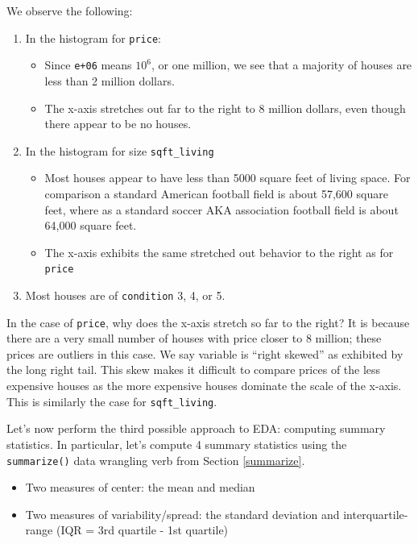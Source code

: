 \documentclass[12pt, krantz2,]{krantz}
\providecommand{\tightlist}{%
  \setlength{\itemsep}{0pt}\setlength{\parskip}{0pt}}
\begin{document}
We observe the following:

\begin{enumerate}
\def\labelenumi{\arabic{enumi}.}
\tightlist
\item
  In the histogram for \texttt{price}:

  \begin{itemize}
  \tightlist
  \item
    Since \texttt{e+06} means \(10^6\), or one million, we see that a majority of houses are less than 2 million dollars.
  \item
    The x-axis stretches out far to the right to 8 million dollars, even though there appear to be no houses.
  \end{itemize}
\item
  In the histogram for size \texttt{sqft\_living}

  \begin{itemize}
  \tightlist
  \item
    Most houses appear to have less than 5000 square feet of living space. For comparison a standard American football field is about 57,600 square feet, where as a standard soccer AKA association football field is about 64,000 square feet.
  \item
    The x-axis exhibits the same stretched out behavior to the right as for \texttt{price}
  \end{itemize}
\item
  Most houses are of \texttt{condition} 3, 4, or 5.
\end{enumerate}

In the case of \texttt{price}, why does the x-axis stretch so far to the right? It is because there are a very small number of houses with price closer to 8 million; these prices are outliers in this case. We say variable is ``right skewed'' as exhibited by the long right tail. This skew makes it difficult to compare prices of the less expensive houses as the more expensive houses dominate the scale of the x-axis. This is similarly the case for \texttt{sqft\_living}.

Let's now perform the third possible approach to EDA: computing summary statistics. In particular, let's compute 4 summary statistics using the \texttt{summarize()} data wrangling verb from Section \ref{summarize}.

\begin{itemize}
\tightlist
\item
  Two measures of center: the mean and median
\item
  Two measures of variability/spread: the standard deviation and interquartile-range (IQR = 3rd quartile - 1st quartile)
\end{itemize}
\end{document}
